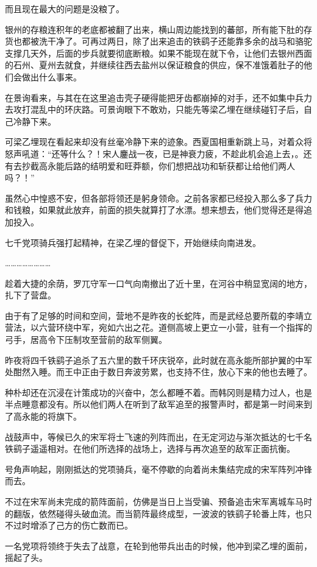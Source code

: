 而且现在最大的问题是没粮了。

银州的存粮连积年的老底都被翻了出来，横山周边能找到的蕃部，所有能下肚的存货也都被洗干净了。可再过两日，除了出来追击的铁鹞子还能靠多余的战马和骆驼支撑几天外，后面的步兵就要彻底断粮。如果不能现在就下令，让他们去银州西面的石州、夏州去就食，并继续往西去盐州以保证粮食的供应，保不准饿着肚子的他们会做出什么事来。

在景询看来，与其在在这里追击壳子硬得能把牙齿都崩掉的对手，还不如集中兵力去攻打混乱中的环庆路。可景询眼下不敢劝，只能先等梁乙埋在继续碰钉子后，自己冷静下来。

可梁乙埋现在看起来却没有丝毫冷静下来的迹象。西夏国相重新跳上马，对着众将怒声吼道：“还等什么？！宋人鏖战一夜，已是神衰力疲，不趁此机会追上去，。还有去抄截高永能后路的结明爱和旺莽额，你们想把战功和斩获都让给他们两人吗？！”

虽然心中惶惑不安，但各部将领还是躬身领命。之前各家都已经投入那么多了兵力和钱粮，如果就此放弃，前面的损失就算打了水漂。想来想去，他们觉得还是得追加投入。

七千党项骑兵强打起精神，在梁乙埋的督促下，开始继续向南进发。

……………………

趁着大捷的余荫，罗兀守军一口气向南撤出了近十里，在河谷中稍显宽阔的地方，扎下了营盘。

由于有了足够的时间和空间，营地不是昨夜的长蛇阵，而是武经总要所载的李靖立营法，以六营环绕中军，宛如六出之花。道侧高坡上更立一小营，驻有一个指挥的弓手，居高令下压制攻至营前的敌军侧翼。

昨夜将四千铁鹞子追杀了五六里的数千环庆锐卒，此时就在高永能所部护翼的中军处酣然入睡。而王中正由于数日奔波劳累，也支持不住，放心下来的他也去睡了。

种朴却还在沉浸在计策成功的兴奋中，怎么都睡不着。而韩冈则是精力过人，也是半点睡意都没有。所以他们两人在听到了敌军追至的报警声时，都是第一时间来到了高永能的将旗下。

战鼓声中，等候已久的宋军将士飞速的列阵而出，在无定河边与渐次抵达的七千名铁鹞子遥遥相对。在他们所选择的战场上，选择与再次追至的敌军正面抗衡。

号角声响起，刚刚抵达的党项骑兵，毫不停歇的向着尚未集结完成的宋军阵列冲锋而去。

不过在宋军尚未完成的箭阵面前，仿佛是当日上当受骗、预备追击宋军离城车马时的翻版，依然碰得头破血流。而当箭阵最终成型，一波波的铁鹞子轮番上阵，也只不过时增添了己方的伤亡数而已。

一名党项将领终于失去了战意，在轮到他带兵出击的时候，他冲到梁乙埋的面前，摇起了头。

